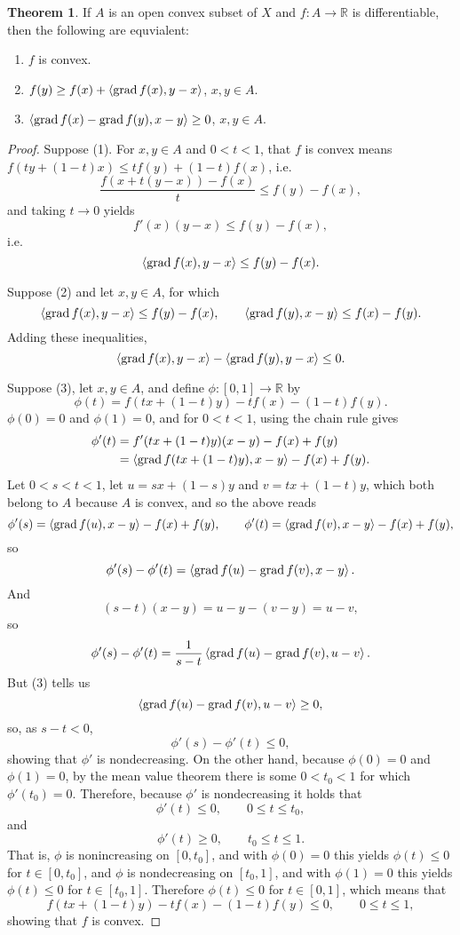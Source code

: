 \documentclass{article}
\newcommand{\inner}[2]{\left\langle #1, #2 \right\rangle}
\newcommand{\grad}{\ensuremath\mathrm{grad}\,}
\theoremstyle{definition}
\newtheorem{theorem}{Theorem}
\theoremstyle{definition}
\begin{document}
\begin{theorem}
If $A$ is an open convex subset of $X$ and $f:A \to \mathbb{R}$ is  differentiable, then the following are
equvialent:
\begin{enumerate}
\item $f$ is convex.
\item $f(y) \geq f(x)+\inner{\grad f(x)}{y-x}$, $x,y \in A$.
\item $\inner{\grad f(x)-\grad f(y)}{x-y} \geq 0$, $x,y \in A$.
\end{enumerate}
\label{convex1}
\end{theorem}
\begin{proof}
Suppose (1). For $x,y \in A$ and $0<t<1$, that $f$ is convex means 
$f(t y + (1-t)x) \leq t f(y)+(1-t)f(x)$, i.e.
\[
\frac{f(x+t(y-x))-f(x)}{t} \leq f(y)-f(x),
\]
and taking $t \to 0$ yields 
\[
f'(x)(y-x) \leq f(y)-f(x),
\]
i.e.
\[
\inner{\grad f(x)}{y-x} \leq f(y)-f(x).
\]

Suppose (2) and let $x,y \in A$, for which
\[
\inner{\grad f(x)}{y-x} \leq f(y)-f(x), \qquad \inner{\grad f(y)}{x-y} \leq f(x)-f(y).
\]
Adding these inequalities,
\[
\inner{\grad f(x)}{y-x}- \inner{\grad f(y)}{y-x}\leq 0.
\]

Suppose (3), let $x,y \in A$, and define $\phi:[0,1] \to \mathbb{R}$ by
\[
\phi(t) = f(tx+(1-t)y)-tf(x)-(1-t)f(y).
\] 
$\phi(0)=0$ and $\phi(1)=0$, and for $0<t<1$, using the chain rule gives
\begin{align*}
\phi'(t) &=  f'(tx+(1-t)y)(x-y)-f(x)+f(y)\\
&=\inner{\grad f(tx+(1-t)y)}{x-y}-f(x)+f(y).
\end{align*}
Let $0<s<t<1$, let $u=sx+(1-s)y$ and $v=tx+(1-t)y$, which both belong to $A$ because $A$ is convex,
and so the above reads
\[
\phi'(s) = \inner{\grad f(u)}{x-y}-f(x)+f(y), \qquad \phi'(t) = \inner{\grad f(v)}{x-y}-f(x)+f(y),
\]
so
\[
\phi'(s)-\phi'(t) = \inner{\grad f(u)-\grad f(v)}{x-y}.
\]
And
\[
(s-t)(x-y) =u-y -(v-y) = u-v, 
\]
so
\[
\phi'(s)-\phi'(t) = \frac{1}{s-t} \inner{\grad f(u)-\grad f(v)}{u-v}.
\]
But
(3) tells us
\[
\inner{\grad f(u)-\grad f(v)}{u-v} \geq 0, 
\]
so, as $s-t <0$,
\[
\phi'(s)-\phi'(t) \leq 0,
\]
showing that $\phi'$ is nondecreasing. 
On the other hand, because $\phi(0)=0$ and $\phi(1)=0$, by the mean value theorem there is some
$0<t_0<1$ for which $\phi'(t_0)=0$.
Therefore, because $\phi'$ is nondecreasing it holds that
\[
\phi'(t) \leq 0, \qquad 0 \leq t \leq t_0,
\]
and 
\[
\phi'(t) \geq 0,\qquad t_0 \leq t \leq 1.
\]
That is, $\phi$ is nonincreasing on $[0,t_0]$, and with $\phi(0)=0$ this yields 
$\phi(t) \leq 0$ for $t \in [0,t_0]$, and
$\phi$ is nondecreasing on $[t_0,1]$, and with $\phi(1)=0$ this yields
$\phi(t) \leq 0$ for $t \in [t_0,1]$.  Therefore $\phi(t) \leq 0$ for $t \in [0,1]$, which means that
\[
f(tx+(1-t)y)-tf(x)-(1-t)f(y) \leq 0, \qquad 0 \leq t \leq 1,
\]
showing that $f$ is convex.
\end{proof}
\end{document}
